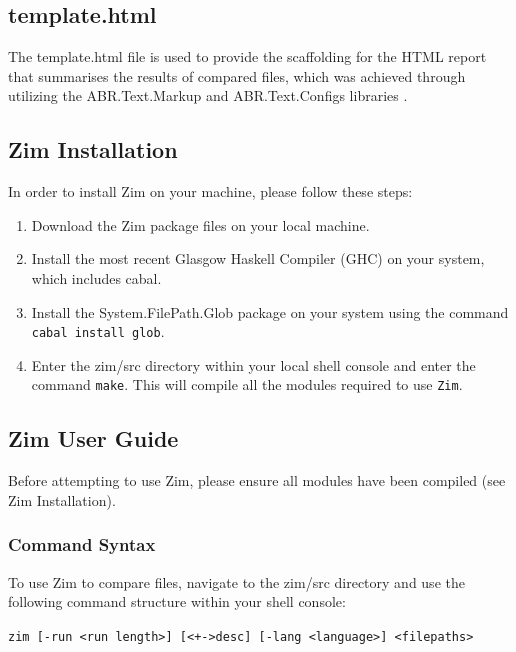 \documentclass[11pt, a4paper]{article}
\begin{document}


\subsection{template.html}

The template.html file is used to provide the scaffolding for the HTML report that summarises the results of compared files, which was achieved through utilizing the ABR.Text.Markup and ABR.Text.Configs libraries \cite{ABRLibraries}.

\bigskip

\subsection{Zim Installation}
In order to install Zim on your machine, please follow these steps:

\begin{enumerate}
	\item Download the Zim package files on your local machine.
	\item Install the most recent Glasgow Haskell Compiler (GHC) on your system, which includes cabal.
	\item Install the System.FilePath.Glob package on your system using the command {\tt cabal install glob}.
	\item Enter the zim/src directory within your local shell console and enter the command {\tt make}. This will compile all the modules required to use {\tt Zim}.
\end{enumerate}

\subsection{Zim User Guide}

Before attempting to use Zim, please ensure all modules have been compiled (see Zim Installation).

\subsubsection{Command Syntax}
To use Zim to compare files, navigate to the zim/src directory and use the following command structure within your shell console:

\bigskip

{\tt zim [-run \textless run length\textgreater ] [\textless+-\textgreater desc] [-lang \textless language\textgreater] \textless filepaths\textgreater}
\end{document}
